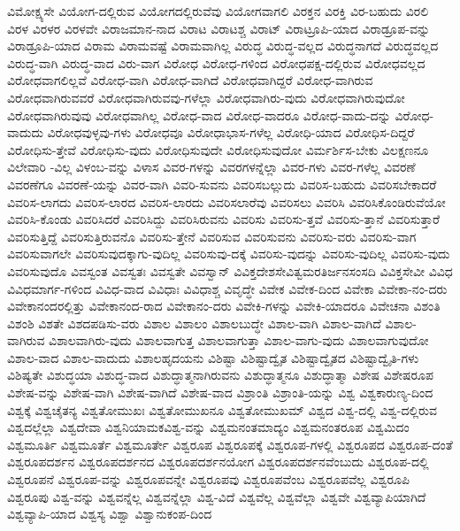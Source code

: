 {ವಿಮೋಕ್ಷ್ಯಸೇ
ವಿಯೋಗ-ದಲ್ಲಿರುವ
ವಿಯೋಗದಲ್ಲಿರುವೆವು
ವಿಯೋಗವಾಗಲಿ
ವಿರಕ್ತನ
ವಿರಕ್ತಿ
ವಿರ-ಬಹುದು
ವಿರಲಿ
ವಿರಳ
ವಿರಳರ
ವಿರಳವೇ
ವಿರಾಜಮಾನ-ನಾದ
ವಿರಾಟ
ವಿರಾಟಶ್ಚ
ವಿರಾಟ್
ವಿರಾಟ್ರೂಪಿ-ಯಾದ
ವಿರಾಡ್ರೂಪ-ವನ್ನು
ವಿರಾಡ್ರೂಪಿ-ಯಾದ
ವಿರಾಮ
ವಿರಾಮವಷ್ಟೆ
ವಿರಾಮವಾಗಿಲ್ಲ
ವಿರುದ್ಧ
ವಿರುದ್ಧ-ವಲ್ಲದ
ವಿರುದ್ಧನಾಗದೆ
ವಿರುದ್ಧವಲ್ಲದ
ವಿರುದ್ಧ-ವಾಗಿ
ವಿರುದ್ಧ-ವಾದ
ವಿರು-ವಾಗ
ವಿರೋಧ
ವಿರೋಧ-ಗಳಿಂದ
ವಿರೋಧಪಕ್ಷ-ದಲ್ಲಿರುವ
ವಿರೋಧವಲ್ಲದ
ವಿರೋಧವಾಗಲಿಲ್ಲವೆ
ವಿರೋಧ-ವಾಗಿ
ವಿರೋಧ-ವಾಗಿದೆ
ವಿರೋಧವಾಗಿದ್ದರೆ
ವಿರೋಧ-ವಾಗಿರುವ
ವಿರೋಧವಾಗಿರುವವರೆ
ವಿರೋಧವಾಗಿರುವವು-ಗಳೆಲ್ಲಾ
ವಿರೋಧವಾಗಿರು-ವುದು
ವಿರೋಧವಾಗಿರುವುದೋ
ವಿರೋಧವಾಗಿರುವುವು
ವಿರೋಧವಾಗಿಲ್ಲ
ವಿರೋಧ-ವಾದ
ವಿರೋಧ-ವಾದರೂ
ವಿರೋಧ-ವಾದು-ದನ್ನು
ವಿರೋಧ-ವಾದುದು
ವಿರೋಧವುಳ್ಳವು-ಗಳು
ವಿರೋಧವೂ
ವಿರೋಧಾಭಾಸ-ಗಳೆಲ್ಲ
ವಿರೋಧಿ-ಯಾದ
ವಿರೋಧಿಸ-ದಿದ್ದರೆ
ವಿರೋಧಿಸು-ತ್ತೇವೆ
ವಿರೋಧಿಸು-ವುದು
ವಿರೋಧಿಸುವುದೇ
ವಿರೋಧಿಸುವುದೋ
ವಿರ್ಮರ್ಶಿಸ-ಬೇಕು
ವಿಲಕ್ಷಣನೂ
ವಿಲೇವಾರಿ
-ವಿಲ್ಲ
ವಿಳಂಬ-ವನ್ನು
ವಿಳಾಸ
ವಿವರ-ಗಳನ್ನು
ವಿವರಗಳನ್ನೆಲ್ಲಾ
ವಿವರ-ಗಳು
ವಿವರ-ಗಳೆಲ್ಲ
ವಿವರಣೆ
ವಿವರಣೆಗೂ
ವಿವರಣೆ-ಯನ್ನು
ವಿವರ-ವಾಗಿ
ವಿವರಿ-ಸುವನು
ವಿವರಿಸಬಲ್ಲುದು
ವಿವರಿಸ-ಬಹುದು
ವಿವರಿಸಬೇಕಾದರೆ
ವಿವರಿಸ-ಲಾಗದು
ವಿವರಿಸ-ಲಾರದ
ವಿವರಿಸ-ಲಾರದು
ವಿವರಿಸಲಾರೆವು
ವಿವರಿಸಲು
ವಿವರಿಸಿ
ವಿವರಿಸಿಕೊಂಡಿರುವೆಯೋ
ವಿವರಿಸಿ-ಕೊಂಡು
ವಿವರಿಸಿದರೆ
ವಿವರಿಸಿದ್ದು
ವಿವರಿಸಿರುವನು
ವಿವರಿಸು
ವಿವರಿಸು-ತ್ತವೆ
ವಿವರಿಸು-ತ್ತಾನೆ
ವಿವರಿಸುತ್ತಾರೆ
ವಿವರಿಸುತ್ತಿದ್ದೆ
ವಿವರಿಸುತ್ತಿರುವನೊ
ವಿವರಿಸು-ತ್ತೇನೆ
ವಿವರಿಸುವ
ವಿವರಿಸುವನು
ವಿವರಿಸು-ವರು
ವಿವರಿಸು-ವಾಗ
ವಿವರಿಸುವಾಗಲೇ
ವಿವರಿಸುವುದಕ್ಕಾಗು-ವುದಿಲ್ಲ
ವಿವರಿಸುವು-ದಕ್ಕೆ
ವಿವರಿಸು-ವುದನ್ನು
ವಿವರಿಸು-ವುದಿಲ್ಲ
ವಿವರಿಸು-ವುದು
ವಿವರಿಸುವುದೊ
ವಿವಸ್ವಂತ
ವಿವಸ್ವತಃ
ವಿವಸ್ವತೇ
ವಿವಸ್ವಾನ್
ವಿವಿಕ್ತದೇಶಸೇವಿತ್ವಮರತಿರ್ಜನಸಂಸದಿ
ವಿವಿಕ್ತಸೇವೀ
ವಿವಿಧ
ವಿವಿಧಮಾರ್ಗ-ಗಳಿಂದ
ವಿವಿಧ-ವಾದ
ವಿವಿಧಾಃ
ವಿವಿಧಾಶ್ಚ
ವಿವೃದ್ಧೇ
ವಿವೇಕ
ವಿವೇಕ-ದಿಂದ
ವಿವೇಕಾ
ವಿವೇಕಾ-ನಂ-ದರು
ವಿವೇಕಾನಂದರಲ್ಲಿತ್ತು
ವಿವೇಕಾನಂದ-ರಾದ
ವಿವೇಕಾನಂ-ದರು
ವಿವೇಕಿ-ಗಳನ್ನು
ವಿವೇಕಿ-ಯಾದರೂ
ವಿವೇಚನಾ
ವಿಶಂತಿ
ವಿಶಂಶಿ
ವಿಶತೇ
ವಿಶದಪಡಿಸು-ವರು
ವಿಶಾಲ
ವಿಶಾಲಂ
ವಿಶಾಲಬುದ್ಧೇ
ವಿಶಾಲ-ವಾಗಿ
ವಿಶಾಲ-ವಾಗಿದೆ
ವಿಶಾಲ-ವಾಗಿರುವ
ವಿಶಾಲವಾಗಿರು-ವುದು
ವಿಶಾಲವಾಗುತ್ತ
ವಿಶಾಲವಾಗುತ್ತಾ
ವಿಶಾಲ-ವಾಗು-ವುದು
ವಿಶಾಲವಾಗುವುದೋ
ವಿಶಾಲ-ವಾದ
ವಿಶಾಲ-ವಾದುದು
ವಿಶಾಲಹೃದಯನು
ವಿಶಿಷ್ಟಾ
ವಿಶಿಷ್ಟಾದ್ವೈತ
ವಿಶಿಷ್ಟಾದ್ವೈತದ
ವಿಶಿಷ್ಟಾದ್ವೈತಿ-ಗಳು
ವಿಶಿಷ್ಯತೇ
ವಿಶುದ್ಧಯಾ
ವಿಶುದ್ಧ-ವಾದ
ವಿಶುದ್ಧಾತ್ಮನಾಗಿರುವನು
ವಿಶುದ್ಧಾತ್ಮನೂ
ವಿಶುದ್ಧಾತ್ಮಾ
ವಿಶೇಷ
ವಿಶೇಷರೂಪ
ವಿಶೇಷ-ವನ್ನು
ವಿಶೇಷ-ವಾಗಿ
ವಿಶೇಷ-ವಾಗಿದೆ
ವಿಶೇಷ-ವಾದ
ವಿಶ್ರಾಂತಿ
ವಿಶ್ರಾಂತಿ-ಯನ್ನು
ವಿಶ್ವ
ವಿಶ್ವಕಾರುಣ್ಯ-ದಿಂದ
ವಿಶ್ವಕ್ಕೆ
ವಿಶ್ವಚೈತನ್ಯ
ವಿಶ್ವತೋಮುಖಃ
ವಿಶ್ವತೋಮುಖನೂ
ವಿಶ್ವತೋಮುಖಮ್
ವಿಶ್ವದ
ವಿಶ್ವ-ದಲ್ಲಿ
ವಿಶ್ವ-ದಲ್ಲಿರುವ
ವಿಶ್ವದಲ್ಲೆಲ್ಲಾ
ವಿಶ್ವದೇವಾ
ವಿಶ್ವನಿಯಾಮಕವಿಶ್ವ-ವನ್ನು
ವಿಶ್ವಮನಂತಮಾದ್ಯಂ
ವಿಶ್ವಮನಂತರೂಪ
ವಿಶ್ವಮಿದಂ
ವಿಶ್ವಮೂರ್ತಿ
ವಿಶ್ವಮೂರ್ತೆ
ವಿಶ್ವಮೂರ್ತೇ
ವಿಶ್ವರೂಪ
ವಿಶ್ವರೂಪಕ್ಕೆ
ವಿಶ್ವರೂಪ-ಗಳಲ್ಲಿ
ವಿಶ್ವರೂಪದ
ವಿಶ್ವರೂಪ-ದಂತೆ
ವಿಶ್ವರೂಪದರ್ಶನ
ವಿಶ್ವರೂಪದರ್ಶನದ
ವಿಶ್ವರೂಪದರ್ಶನಯೋಗ
ವಿಶ್ವರೂಪದರ್ಶನವೆಂಬುದು
ವಿಶ್ವರೂಪ-ದಲ್ಲಿ
ವಿಶ್ವರೂಪನೆ
ವಿಶ್ವರೂಪ-ವನ್ನು
ವಿಶ್ವರೂಪವನ್ನೇ
ವಿಶ್ವರೂಪವು
ವಿಶ್ವರೂಪವೆಂಬ
ವಿಶ್ವರೂಪವೆಲ್ಲ
ವಿಶ್ವರೂಪಿ
ವಿಶ್ವರೂಪು
ವಿಶ್ವ-ವನ್ನು
ವಿಶ್ವವನ್ನೆಲ್ಲ
ವಿಶ್ವವನ್ನೆಲ್ಲಾ
ವಿಶ್ವ-ವಿದೆ
ವಿಶ್ವವೆಲ್ಲ
ವಿಶ್ವವೆಲ್ಲಾ
ವಿಶ್ವವೇ
ವಿಶ್ವವ್ಯಾಪಿಯಾಗಿದೆ
ವಿಶ್ವವ್ಯಾಪಿ-ಯಾದ
ವಿಶ್ವಸ್ಯ
ವಿಶ್ವಾ
ವಿಶ್ವಾನುಕಂಪ-ದಿಂದ
}
